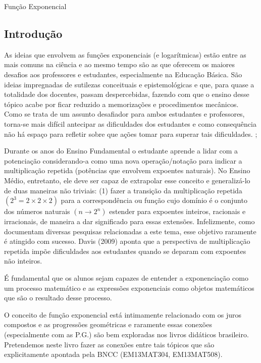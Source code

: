 \mainmatter

\begin{apresentacao}{Função Exponencial}

\subsection{Introdução}
As ideias que envolvem as funções exponenciais (e logarítmicas) estão entre as mais comuns na ciência e ao mesmo tempo são as que oferecem os maiores desafios aos professores e estudantes, especialmente na Educação Básica. São ideias impregnadas de sutilezas conceituais e epistemológicas e que, para quase a totalidade dos docentes, passam despercebidas, fazendo com que o ensino desse tópico acabe por ficar reduzido a memorizações e procedimentos mecânicos. Como se trata de um assunto desafiador para ambos estudantes e professores, torna-se mais difícil antecipar as dificuldades dos estudantes e como consequência não há espaço para refletir sobre que ações tomar para superar tais dificuldades. \citep{Davis2009}; \citep{Weber2002}

Durante os anos do Ensino Fundamental o estudante aprende a lidar com a potenciação considerando-a como uma nova operação/notação para indicar a multiplicação repetida (potências que envolvem expoentes naturais). No Ensino Médio, entretanto, ele deve ser capaz de extrapolar esse conceito e generalizá-lo de duas maneiras não triviais: (1) fazer a transição da multiplicação repetida $(2^{3}=2 \times 2 \times 2 )$ para a correspondência ou função cujo domínio é o conjunto dos números naturais $(n \longrightarrow 2^{n})$ estender para expoentes inteiros, racionais e irracionais, de maneira a dar significado para essas extensões. Infelizmente, como documentam diversas pesquisas relacionadas a este tema, esse objetivo raramente é atingido com sucesso.  Davis (2009) aponta que a perspectiva de multiplicação repetida impõe dificuldades aos estudantes quando se deparam com expoentes não inteiros.

É fundamental que os alunos sejam capazes de entender a exponenciação como um processo matemático e as expressões exponenciais como objetos matemáticos que são o resultado desse processo. \citep{Weber2002}

O conceito de função exponencial está intimamente relacionado com os juros compostos e as progressões geométricas e raramente essas conexões (especialmente com as P.G.) são bem exploradas nos livros didáticos brasileiro. Pretendemos neste livro fazer as conexões entre tais tópicos que são explicitamente apontada pela BNCC \citep{BNCC2018} (EM13MAT304, EM13MAT508). 


\end{apresentacao}
